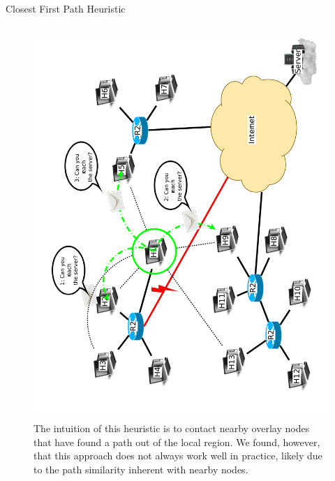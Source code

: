 \documentclass[pdftex]{beamer}
\begin{document}
\begin{frame}{Closest First Path Heuristic}
\begin{columns}
\begin{column}{.5\textwidth}
\begin{figure}
\includegraphics[height=\textwidth,angle=-90]{nearest_neighbor}
\caption{The intuition of this heuristic is to contact nearby overlay nodes that have found a path out of the local region.  We found, however, that this approach does not always work well in practice, likely due to the path similarity inherent with nearby nodes.}
\end{figure}
\end{column}

\end{columns}
\end{frame}


\end{document}

